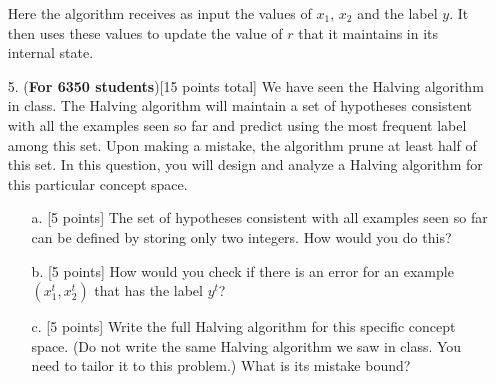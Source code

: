 \begin{enumerate}
Here the algorithm receives as input the values of $x_1$, $x_2$ and the label $y$. It then uses these values to update the value of $r$ that it maintains in its internal state.

\item[5.] ({\bf For 6350 students})[15 points total] We have seen the
  Halving algorithm in class. The Halving algorithm will maintain a
  set of hypotheses consistent with all the examples seen so far and
  predict using the most frequent label among this set. Upon making a
  mistake, the algorithm prune at least half of this set. In this
  question, you will design and analyze a Halving algorithm for this
  particular concept space.

  \begin{enumerate}
  \item[a.] [5 points] The set of hypotheses consistent with all
    examples seen so far can be defined by storing only two integers.
    How would you do this?
  \item[b.] [5 points] How would you check if there is an error for an
    example $(x_1^t, x_2^t)$ that has the label $y^t$?
  \item[c.] [5 points] Write the full Halving algorithm for this
    specific concept space. (Do not write the same Halving algorithm
    we saw in class. You need to tailor it to this problem.) What is
    its mistake bound?
  \end{enumerate}

\end{enumerate}


